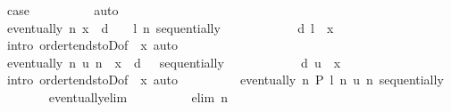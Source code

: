 \begin{isabellebody}
\ {\isacharquery}{\kern0pt}case\isanewline
\ \ \ \ \ \ \ \ \isamarkupfalse%
\ auto\isanewline
\ \ \ \ \isamarkupfalse%
\isanewline
\ \ \ \ \isamarkupfalse%
\isanewline
\ \ \ \ \isacommand{{\isacharbraceleft}{\kern0pt}}\isamarkupfalse%
\isanewline
\ \ \ \ \ \ \isamarkupfalse%
\ {\isachardoublequoteopen}eventually\ {\isacharparenleft}{\kern0pt}{\isasymlambda}n{\isachardot}{\kern0pt}\ x\ {\isacharminus}{\kern0pt}\ d\ {\isacharslash}{\kern0pt}\ {}\ {\isacharless}{\kern0pt}\ l\ n{\isacharparenright}{\kern0pt}\ sequentially{\isachardoublequoteclose}\isanewline
\ \ \ \ \ \ \ \ \isamarkupfalse%
\ {\isacartoucheopen}{}\ {\isacharless}{\kern0pt}\ d{\isacartoucheclose}\ {\isacartoucheopen}l\ {\isasymlonglonglongrightarrow}\ x{\isacartoucheclose}\ \isamarkupfalse%
\ {\isacharparenleft}{\kern0pt}intro\ order{\isacharunderscore}{\kern0pt}tendstoD{\isacharbrackleft}{\kern0pt}of\ {\isacharunderscore}{\kern0pt}\ x{\isacharbrackright}{\kern0pt}{\isacharparenright}{\kern0pt}\ auto\isanewline
\ \ \ \ \ \ \isamarkupfalse%
\ \isamarkupfalse%
\ {\isachardoublequoteopen}eventually\ {\isacharparenleft}{\kern0pt}{\isasymlambda}n{\isachardot}{\kern0pt}\ u\ n\ {\isacharless}{\kern0pt}\ x\ {\isacharplus}{\kern0pt}\ d\ {\isacharslash}{\kern0pt}\ {}{\isacharparenright}{\kern0pt}\ sequentially{\isachardoublequoteclose}\isanewline
\ \ \ \ \ \ \ \ \isamarkupfalse%
\ {\isacartoucheopen}{}\ {\isacharless}{\kern0pt}\ d{\isacartoucheclose}\ {\isacartoucheopen}u\ {\isasymlonglonglongrightarrow}\ x{\isacartoucheclose}\ \isamarkupfalse%
\ {\isacharparenleft}{\kern0pt}intro\ order{\isacharunderscore}{\kern0pt}tendstoD{\isacharbrackleft}{\kern0pt}of\ {\isacharunderscore}{\kern0pt}\ x{\isacharbrackright}{\kern0pt}{\isacharparenright}{\kern0pt}\ auto\isanewline
\ \ \ \ \ \ \isamarkupfalse%
\ \isamarkupfalse%
\ {\isachardoublequoteopen}eventually\ {\isacharparenleft}{\kern0pt}{\isasymlambda}n{\isachardot}{\kern0pt}\ P\ {\isacharparenleft}{\kern0pt}l\ n{\isacharparenright}{\kern0pt}\ {\isacharparenleft}{\kern0pt}u\ n{\isacharparenright}{\kern0pt}{\isacharparenright}{\kern0pt}\ sequentially{\isachardoublequoteclose}\isanewline
\ \ \ \ \ \ \isamarkupfalse%
\ eventually{\isacharunderscore}{\kern0pt}elim\isanewline
\ \ \ \ \ \ \ \ \isamarkupfalse%
\ {\isacharparenleft}{\kern0pt}elim\ n{\isacharparenright}{\kern0pt}\isanewline

\end{isabellebody}
